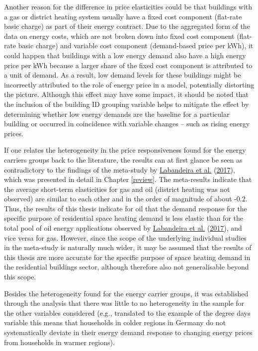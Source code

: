 \documentclass[12pt,twoside]{reedthesis}
\begin{document}
Another reason for the difference in price elasticities could be that buildings with a gas or district heating system usually have a fixed cost component (flat-rate basic charge) as part of their energy contract. Due to the aggregated form of the data on energy costs, which are not broken down into fixed cost component (flat-rate basic charge) and variable cost component (demand-based price per kWh), it could happen that buildings with a low energy demand also have a high energy price per kWh because a larger share of the fixed cost component is attributed to a unit of demand. As a result, low demand levels for these buildings might be incorrectly attributed to the role of energy price in a model, potentially distorting the picture. Although this effect may have some impact, it should be noted that the inclusion of the building ID grouping variable helps to mitigate the effect by determining whether low energy demands are the baseline for a particular building or occurred in coincidence with variable changes -- such as rising energy prices.

If one relates the heterogeneity in the price responsiveness found for the energy carriers groups back to the literature, the results can at first glance be seen as contradictory to the findings of the meta-study by \protect\hyperlink{ref-labandeira_etal17}{Labandeira et al.} (\protect\hyperlink{ref-labandeira_etal17}{2017}), which was presented in detail in Chapter \ref{review}. The meta-results indicate that the average short-term elasticities for gas and oil (district heating was not observed) are similar to each other and in the order of magnitude of about -0.2. Thus, the results of this thesis indicate for oil that the demand response for the specific purpose of residential space heating demand is less elastic than for the total pool of oil energy applications observed by \protect\hyperlink{ref-labandeira_etal17}{Labandeira et al.} (\protect\hyperlink{ref-labandeira_etal17}{2017}), and vice versa for gas. However, since the scope of the underlying individual studies in the meta-study is naturally much wider, it may be assumed that the results of this thesis are more accurate for the specific purpose of space heating demand in the residential buildings sector, although therefore also not generalisable beyond this scope.

Besides the heterogeneity found for the energy carrier groups, it was established through the analysis that there was little to no heterogeneity in the sample for the other variables considered (e.g., translated to the example of the degree days variable this means that households in colder regions in Germany do not systematically deviate in their energy demand response to changing energy prices from households in warmer regions).
\end{document}

